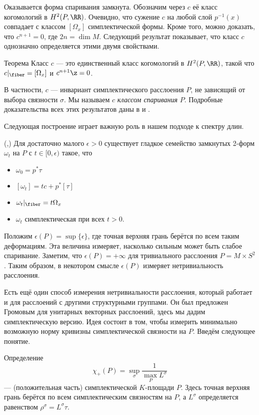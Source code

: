 Оказывается форма спаривания замкнута.
Обозначим через $c$ её класс когомологий в $H^2 (P, \RR)$.
Очевидно, что сужение $c$ на любой слой $p^{-1}(x)$ совпадает с классом $[\Omega_x]$ симплектической формы.
Кроме того, можно доказать, что $c^{n+1} = 0$, где $2n = \dim M$.
Следующий результат показывает, что класс $c$ однозначно определяется этими двумя свойствами.

\begin{thm}{Теорема}\label{9.3.A}
Класс $c$ --- это единственный класс когомологий в $H^2 (P, \RR)$, такой что $c|_\fiber = [\Omega_x]$ и $c^{n+1} \z= 0$.
\end{thm}

В частности, $c$ --- инвариант симплектического расслоения $P$, не зависящий от выбора связности $\sigma$.
Мы называем $c$ \emph{классом спаривания} $P$.
Подробные доказательства всех этих результатов даны в \cite{GLS} и \cite{MS}.

Следующая построение играет важную роль в нашем подходе к спектру длин.

(\cite{GLS},\cite{MS})
Для достаточно малого $\epsilon > 0$ существует гладкое семейство замкнутых 2-форм $\omega_t$ на $P$ с $t \in [0, \epsilon)$ такое, что
\begin{itemize}
\item $\omega_0 = p^\ast \tau$
\item $[\omega_t] = tc + p^\ast [\tau]$
\item $\omega_t|_\fiber = t\Omega_x$
\item $\omega_t$ симплектическая при всех $t > 0$.
\end{itemize}

Положим $\epsilon(P) = \sup \{\epsilon\}$, где точная верхняя грань берётся по всем таким деформациям.
Эта величина измеряет, насколько сильным может быть слабое спаривание.
Заметим, что $\epsilon(P) = +\infty$ для тривиального расслоения $P = M \times S^2$.
Таким образом, в некотором смысле $\epsilon(P)$ измеряет нетривиальность расслоения.

Есть ещё один способ измерения нетривиальности расслоения, который работает и для расслоений с другими структурными группами.
Он был предложен Громовым \cite{G2} для унитарных векторных расслоений, здесь мы дадим симплектическую версию.
Идея состоит в том, чтобы измерить минимально возможную норму кривизны симплектической связности на $P$.
Введём следующее понятие.

\begin{thm*}{Определение}
\[\chi_+ (P) = \sup_\sigma \frac1{\max_P L^\sigma}\]
--- (положительная часть) симплектической $K$-площади $P$.
Здесь точная верхняя грань берётся по всем симплектическим связностям на $P$, а $L^\sigma$ определяется равенством $\rho^\sigma = L^\sigma \tau$.
\end{thm*}

